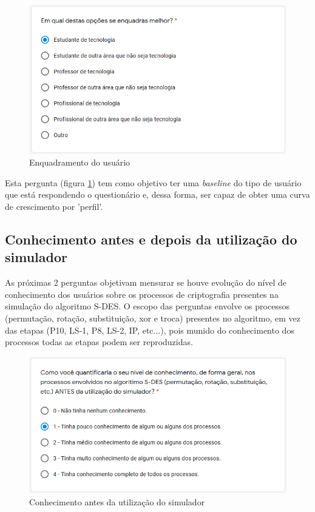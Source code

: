 \begin{figure}[H]
    \centering
    \caption{Enquadramento do usuário}
    \label{fig:enquadramentousuario}
    \includegraphics[width=0.75\linewidth]{Questionario/Q1.png}
\end{figure}

Esta pergunta (figura \ref{fig:enquadramentousuario}) tem como objetivo ter uma \textit{baseline} do tipo de usuário que está respondendo o questionário e, dessa forma, ser capaz de obter uma curva de crescimento por 'perfil'.

\subsection{Conhecimento antes e depois da utilização do simulador}
As próximas 2 perguntas objetivam mensurar se houve evolução do nível de conhecimento dos usuários sobre os processos de criptografia presentes na simulação do algoritmo S-DES. O escopo das perguntas envolve os processos (permutação, rotação, substituição, xor e troca) presentes no algoritmo, em vez das etapas (P10, LS-1, P8, LS-2, IP, etc...), pois munido do conhecimento dos processos todas as etapas podem ser reproduzidas.

\begin{figure}[H]
    \centering
    \caption{Conhecimento antes da utilização do simulador}
    \label{fig:conhecimentoantes}
    \includegraphics[width=0.75\linewidth]{Questionario/Q2.png}
\end{figure}

